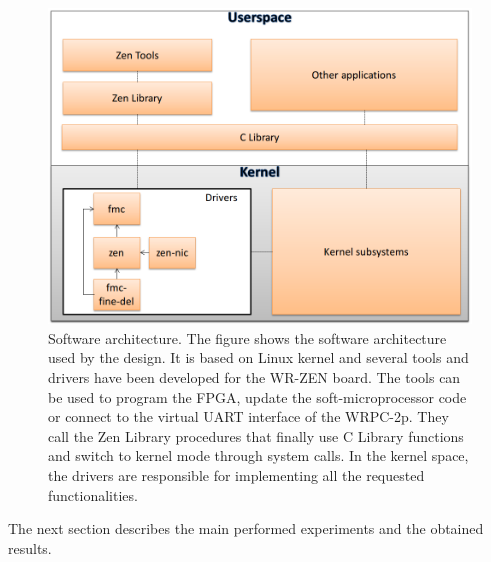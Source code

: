 \begin{figure}[H] \centering
	\includegraphics[scale=0.4]{img/software_architecture}
	\caption{Software architecture. The figure shows the software
	architecture used by the design. It is based on Linux kernel and
	several tools and drivers have been developed for the WR-ZEN board. The
	tools can be used to program the FPGA, update the soft-microprocessor
	code or connect to the virtual UART interface of the WRPC-2p. They call
	the Zen Library procedures that finally use C Library functions and
	switch to kernel mode through system calls. In the kernel space, the
drivers are responsible for implementing all the requested functionalities. }
\label{fig:software_architecture} \end{figure}

The next section describes the main performed experiments and the obtained
results.

